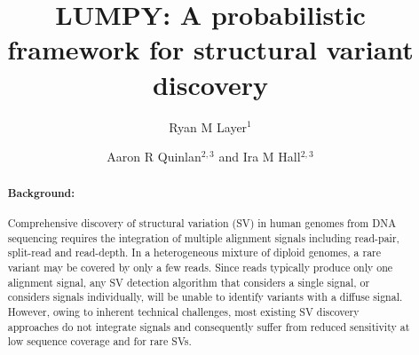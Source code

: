 \documentclass[10pt]{bmc_article}
\newenvironment{bmcformat}{\begin{raggedright}\baselineskip20pt\sloppy\setboolean{publ}{false}}{\end{raggedright}\baselineskip20pt\sloppy}
\begin{document}
\begin{bmcformat}

\title{LUMPY: A probabilistic framework for structural variant discovery}
\author{
Ryan M Layer$^1$\and
Aaron R Quinlan\correspondingauthor$^{2,3}$
and
Ira M Hall\correspondingauthor$^{2,3}$
}

\address{\iid(1)Department of Computer Science, University of Virginia,
Charlottesville, VA\\
\iid(2)Department of Biochemistry and Molecular Genetics,
University of Virginia, Charlottesville, VA\\
\iid(3)Department of Public Health Sciences and
Center for Public Health Genomics, University of Virginia, Charlottesville, VA
}


\maketitle
\begin{abstract}
\paragraph*{Background:} Comprehensive discovery of structural variation (SV) in
human genomes from DNA sequencing requires the integration of multiple alignment
signals including read-pair, split-read and read-depth.  In a heterogeneous
mixture of diploid genomes, a rare variant may be covered by only a few reads.
Since reads typically produce only one alignment signal, any SV detection
algorithm that considers a single signal, or considers signals individually,
will be unable to identify variants with a diffuse signal.  However, owing to
inherent technical challenges, most existing SV discovery approaches do not
integrate signals and consequently suffer from reduced sensitivity at low
sequence coverage and for rare SVs.

\end{abstract}
\end{bmcformat}
\end{document}
